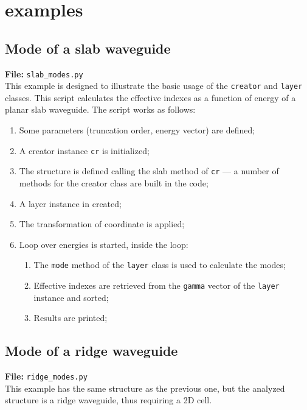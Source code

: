 \documentclass[a4paper,10pt]{report}
\begin{document}
\section{examples}

\subsection{Mode of a slab waveguide} \label{ex:slab_modes}
\textbf{File:} \texttt{slab\_modes.py} \\
This example is designed to illustrate the basic usage of the \texttt{creator} and \texttt{layer} classes. This script calculates the effective indexes as a function of energy of a planar slab waveguide. The script works as follows:
\begin{enumerate}
\itemsep0em 
\item Some parameters (truncation order, energy vector) are defined;
\item A creator instance \texttt{cr} is initialized;
\item The structure is defined calling the slab method of \texttt{cr} --- a number of methods for the creator class are built in the code;
\item A layer instance in created;
\item The transformation of coordinate is applied;
\item Loop over energies is started, inside the loop:
\begin{enumerate}
\itemsep0em 
\item The \texttt{mode} method of the \texttt{layer} class is used to calculate the modes;
\item Effective indexes are retrieved from the \texttt{gamma} vector of the \texttt{layer} instance and sorted;
\item Results are printed;
\end{enumerate}
\end{enumerate}

\subsection{Mode of a ridge waveguide}
\textbf{File:} \texttt{ridge\_modes.py} \\
This example has the same structure as the previous one, but the analyzed structure is a ridge waveguide, thus requiring a 2D cell. 
\end{document}

